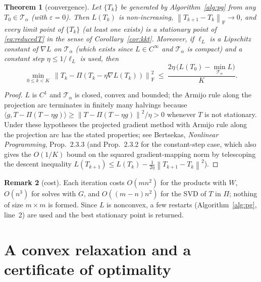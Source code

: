 \documentclass[11pt]{article}
\newtheorem{theorem}{Theorem}[section]
\theoremstyle{definition}
\newtheorem{remark}[theorem]{Remark}
\newcommand{\norm}[1]{\left\lVert #1 \right\rVert}
\newcommand{\Fro}{\mathrm{F}}
\newcommand{\Pop}{\Pi}
\newcommand{\Tf}{\mathcal{T}}
\begin{document}
\begin{theorem}[convergence]\label{thm:conv}
Let $\{T_k\}$ be generated by Algorithm~\ref{alg:pg} from any $T_0\in\Tf_\alpha$ (with $\varepsilon=0$).
Then $L(T_k)$ is non-increasing, $\norm{T_{k+1}-T_k}_\Fro\to0$, and every limit point of $\{T_k\}$ (at least one exists) is a stationary point of \eqref{eq:reducedT} in the sense of Corollary~\ref{cor:kkt}.
Moreover, if $\ell_L$ is a Lipschitz constant of $\nabla L$ on $\Tf_\alpha$ (which exists since $L\in C^\infty$ and $\Tf_\alpha$ is compact) and a constant step $\eta\le 1/\ell_L$ is used, then
\[
\min_{0\le k<K}\ \norm{T_k-\Pop(T_k-\eta\nabla L(T_k))}_\Fro^2\ \le\ \frac{2\eta\,\big(L(T_0)-\min_{\Tf_\alpha}L\big)}{K}.
\]
\end{theorem}
\begin{proof}
$L$ is $C^1$ and $\Tf_\alpha$ is closed, convex and bounded; the Armijo rule along the projection arc terminates in finitely many halvings because $\langle g,T-\Pop(T-\eta g)\rangle\ge \norm{T-\Pop(T-\eta g)}^2/\eta>0$ whenever $T$ is not stationary. Under these hypotheses the projected gradient method with Armijo rule along the projection arc has the stated properties; see Bertsekas, \emph{Nonlinear Programming}, Prop.\ 2.3.3 (and Prop.\ 2.3.2 for the constant-step case, which also gives the $O(1/K)$ bound on the squared gradient-mapping norm by telescoping the descent inequality $L(T_{k+1})\le L(T_k)-\tfrac{1}{2\eta}\norm{T_{k+1}-T_k}^2$).
\end{proof}

\begin{remark}[cost]
Each iteration costs $O(mn^2)$ for the products with $W$, $O(n^3)$ for solves with $G$, and $O((m-n)n^2)$ for the SVD of $T$ in $\Pop$; nothing of size $m\times m$ is formed. Since $L$ is nonconvex, a few restarts (Algorithm~\ref{alg:pg}, line~2) are used and the best stationary point is returned.
\end{remark}

\section{A convex relaxation and a certificate of optimality}
\end{document}
